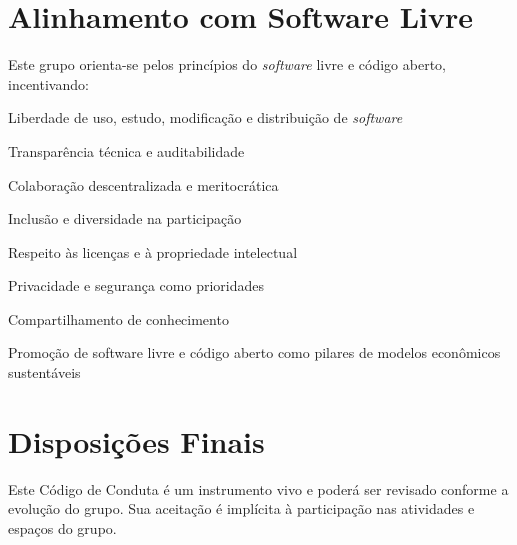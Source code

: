 \documentclass[
  12pt,          %
  a4paper,       %
  oneside,       %
  brazil         %
]{article}
\begin{document}
\section{Alinhamento com Software Livre}

Este grupo orienta-se pelos princípios do \textit{software} livre e código aberto, incentivando:

\begin{conduta}
  \item Liberdade de uso, estudo, modificação e distribuição de \textit{software}
  \item Transparência técnica e auditabilidade
  \item Colaboração descentralizada e meritocrática
  \item Inclusão e diversidade na participação 
  \item Respeito às licenças e à propriedade intelectual 
  \item Privacidade e segurança como prioridades 
  \item Compartilhamento de conhecimento
  \item Promoção de software livre e código aberto como pilares de modelos econômicos sustentáveis
\end{conduta}

\section{Disposições Finais}

Este Código de Conduta é um instrumento vivo e poderá ser revisado conforme a evolução do grupo. Sua aceitação é implícita à participação nas atividades e 
espaços do grupo.

\vspace{2cm}

\end{document}
